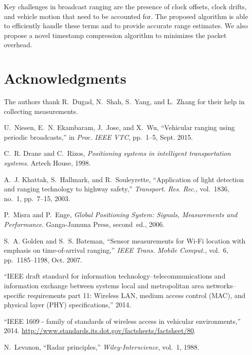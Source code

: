 \documentclass[12pt,journal,final,onecolumn]{IEEEtran}
\theoremstyle{definition}
\theoremstyle{myremark}
\begin{document}
Key challenges in broadcast ranging are the presence of clock offsets, clock
drifts, and vehicle motion that need to be accounted for.  The proposed
algorithm is able to efficiently handle these terms and to provide accurate
range estimates. We also propose a novel timestamp compression algorithm to
minimizes the packet overhead.


\section*{Acknowledgments}

The authors thank R.~Dugad, N.~Shah, S.~Yang, and L.~Zhang for their help in
collecting measurements.


\begin{thebibliography}{10}

U.~Niesen, E.~N. Ekambaram, J.~Jose, and X.~Wu, ``Vehicular ranging using
  periodic broadcasts,'' in {\em Proc. IEEE VTC}, pp.~1--5, Sept. 2015.

C.~R. Drane and C.~Rizos, {\em Positioning systems in intelligent
  transportation systems}.
\newblock Artech House, 1998.

A.~J. Khattak, S.~Hallmark, and R.~Souleyrette, ``Application of light
  detection and ranging technology to highway safety,'' {\em Transport. Res.
  Rec.}, vol.~1836, no.~1, pp.~7--15, 2003.

P.~Misra and P.~Enge, {\em Global Positioning System: Signals, Measurements and
  Performance}.
\newblock Ganga-Jamuna Press, second~ed., 2006.

S.~A. Golden and S.~S. Bateman, ``Sensor measurements for {Wi-Fi} location with
  emphasis on time-of-arrival ranging,'' {\em IEEE Trans. Mobile Comput.},
  vol.~6, pp.~1185--1198, Oct. 2007.

``{IEEE} draft standard for information technology--telecommunications and
  information exchange between systems local and metropolitan area
  networks--specific requirements part 11: Wireless {LAN}, medium access
  control ({MAC}), and physical layer ({PHY}) specifications,'' 2014.

``{IEEE} 1609 - family of standards of wireless access in vehicular
  environments,'' 2014.
\newblock \url{http://www.standards.its.dot.gov/factsheets/factsheet/80}.

N.~Levanon, ``Radar principles,'' {\em Wiley-Interscience}, vol.~1, 1988.


\end{thebibliography}
\end{document}
